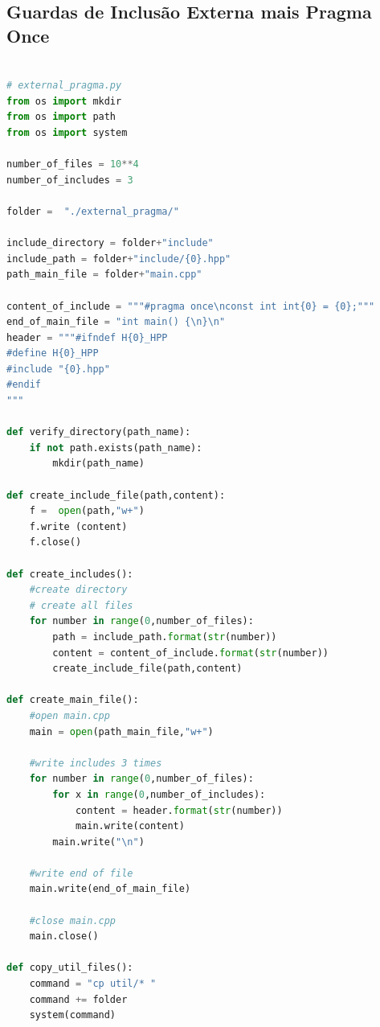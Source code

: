 \begin{apendicesenv}
\section{Guardas de Inclusão Externa mais Pragma Once}

\begin{lstlisting}[language=Python, caption={
     Script Guardas de Inclusão Externa mais pragma once},
                  label=script_external_pragma_include]

# external_pragma.py
from os import mkdir
from os import path
from os import system

number_of_files = 10**4
number_of_includes = 3

folder =  "./external_pragma/"

include_directory = folder+"include"
include_path = folder+"include/{0}.hpp"
path_main_file = folder+"main.cpp"

content_of_include = """#pragma once\nconst int int{0} = {0};"""
end_of_main_file = "int main() {\n}\n"
header = """#ifndef H{0}_HPP
#define H{0}_HPP
#include "{0}.hpp"
#endif
"""

def verify_directory(path_name):
    if not path.exists(path_name):
        mkdir(path_name)

def create_include_file(path,content):
    f =  open(path,"w+")
    f.write (content)
    f.close()

def create_includes():
    #create directory
    # create all files
    for number in range(0,number_of_files):
        path = include_path.format(str(number))
        content = content_of_include.format(str(number))
        create_include_file(path,content)
    
def create_main_file():
    #open main.cpp
    main = open(path_main_file,"w+")

    #write includes 3 times
    for number in range(0,number_of_files):
        for x in range(0,number_of_includes):
            content = header.format(str(number))
            main.write(content)
        main.write("\n")

    #write end of file
    main.write(end_of_main_file)

    #close main.cpp
    main.close()
                                                                                  
def copy_util_files():                                                           
    command = "cp util/* "                                                       
    command += folder                                                            
    system(command)      


\end{lstlisting}
\end{apendicesenv}

